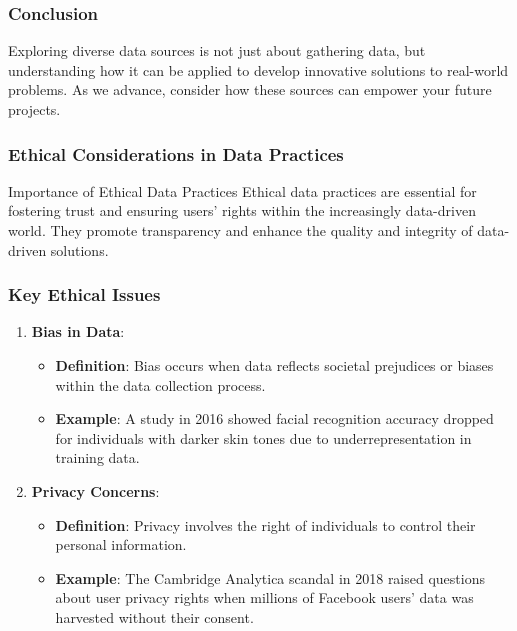 \documentclass[aspectratio=169]{beamer}
\begin{document}
\begin{frame}[fragile]
    \frametitle{Conclusion}
    Exploring diverse data sources is not just about gathering data, but understanding how it can be applied to develop innovative solutions to real-world problems. As we advance, consider how these sources can empower your future projects.
\end{frame}

\begin{frame}[fragile]
    \frametitle{Ethical Considerations in Data Practices}
    \begin{block}{Importance of Ethical Data Practices}
        Ethical data practices are essential for fostering trust and ensuring users' rights within the increasingly data-driven world. 
        They promote transparency and enhance the quality and integrity of data-driven solutions.
    \end{block}
\end{frame}

\begin{frame}[fragile]
    \frametitle{Key Ethical Issues}
    \begin{enumerate}
        \item \textbf{Bias in Data}:
        \begin{itemize}
            \item \textbf{Definition}: Bias occurs when data reflects societal prejudices or biases within the data collection process.
            \item \textbf{Example}: A study in 2016 showed facial recognition accuracy dropped for individuals with darker skin tones due to underrepresentation in training data.
        \end{itemize}
        
        \item \textbf{Privacy Concerns}:
        \begin{itemize}
            \item \textbf{Definition}: Privacy involves the right of individuals to control their personal information.
            \item \textbf{Example}: The Cambridge Analytica scandal in 2018 raised questions about user privacy rights when millions of Facebook users' data was harvested without their consent.
        \end{itemize}
    \end{enumerate}
\end{frame}
\end{document}
